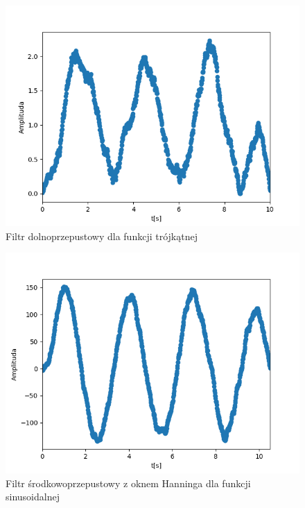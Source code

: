 \documentclass[12pt]{article}
\begin{document}
\begin{figure}[H]
\centering
\includegraphics[scale=0.6]{filtrDolTrojkat.png}
\caption{Filtr dolnoprzepustowy dla funkcji trójkątnej}
\end{figure}

\begin{figure}[H]
\centering
\includegraphics[scale=0.6]{filtrSrodekHanningSinus.png}
\caption{Filtr środkowoprzepustowy z oknem Hanninga dla funkcji sinusoidalnej}
\end{figure}
\end{document}
